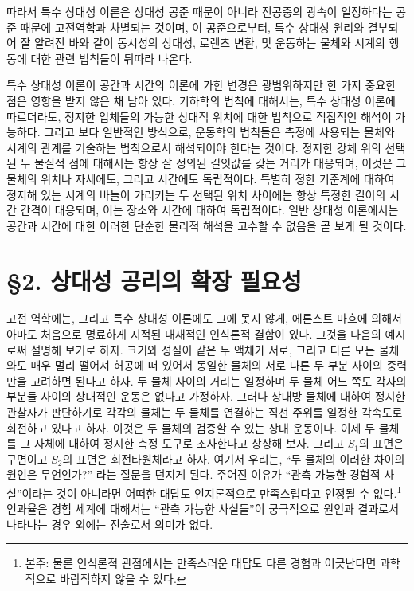 \documentclass[b5paper]{article}
\begin{document}
따라서 특수 상대성 이론은 상대성 공준 때문이 아니라 진공중의 광속이 일정하다는 공준 때문에 고전역학과 차별되는 것이며, 이 공준으로부터, 특수 상대성 원리와 결부되어 잘 알려진 바와 같이 동시성의 상대성, 로렌츠 변환, 및 운동하는 물체와 시계의 행동에 대한 관련 법칙들이 뒤따라 나온다. 

특수 상대성 이론이 공간과 시간의 이론에 가한 변경은 광범위하지만 한 가지 중요한 점은 영향을 받지 않은 채 남아 있다.
기하학의 법칙에 대해서는, 특수 상대성 이론에 따르더라도, 정지한 입체들의 가능한 상대적 위치에 대한 법칙으로 직접적인 해석이 가능하다.
그리고 보다 일반적인 방식으로, 운동학의 법칙들은 측정에 사용되는 물체와 시계의 관계를 기술하는 법칙으로서 해석되어야 한다는 것이다.
정지한 강체 위의 선택된 두 물질적 점에 대해서는 항상 잘 정의된 길잇값를 갖는 거리가 대응되며, 이것은 그 물체의 위치나 자세에도, 그리고 시간에도 독립적이다. 특별히 정한 기준계에 대하여 정지해 있는 시계의 바늘이 가리키는 두 선택된 위치 사이에는 항상 특정한 길이의 시간 간격이 대응되며, 이는 장소와 시간에 대하여 독립적이다.
일반 상대성 이론에서는 공간과 시간에 대한 이러한 단순한 물리적 해석을 고수할 수 없음을 곧 보게 될 것이다.

\section*{\S 2. 상대성 공리의 확장 필요성}

고전 역학에는, 그리고 특수 상대성 이론에도 그에 못지 않게, 에른스트 마흐에 의해서 아마도 처음으로 명료하게 지적된 내재적인 인식론적 결함이 있다. 그것을 다음의 예시로써 설명해 보기로 하자. 크기와 성질이 같은 두 액체가 서로, 그리고 다른 모든 물체와도 매우 멀리 떨어져 허공에 떠 있어서 동일한 물체의 서로 다른 두 부분 사이의 중력만을 고려하면 된다고 하자. 두 물체 사이의 거리는 일정하며 두 물체 어느 쪽도 각자의 부분들 사이의 상대적인 운동은 없다고 가정하자. 그러나 상대방 물체에 대하여 정지한 관찰자가 판단하기로 각각의 물체는 두 물체를 연결하는 직선 주위를 일정한 각속도로 회전하고 있다고 하자. 이것은 두 물체의 검증할 수 있는 상대 운동이다. 이제 두 물체를 그 자체에 대하여 정지한 측정 도구로 조사한다고 상상해 보자. 그리고 $S_1$의 표면은 구면이고 $S_2$의 표면은 회전타원체라고 하자.
여기서 우리는, ``두 물체의 이러한 차이의 원인은 무언인가?'' 라는 질문을 던지게 된다. 주어진 이유가 ``관측 가능한 경험적 사실''이라는 것이 아니라면 어떠한 대답도 인지론적으로 만족스럽다고 인정될 수 없다.\footnote{본주: 물론 인식론적 관점에서는 만족스러운 대답도 다른 경험과 어긋난다면 과학적으로 바람직하지 않을 수 있다.} 인과율은 경험 세계에 대해서는 ``관측 가능한 사실들''이 궁극적으로 원인과 결과로서 나타나는 경우 외에는 진술로서 의미가 없다.
\end{document}
